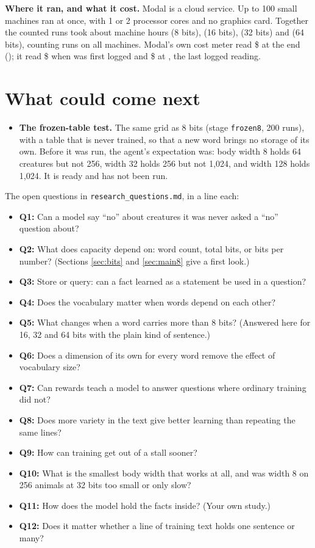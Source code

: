 \textbf{Where it ran, and what it cost.} Modal is a cloud service. Up to 100 small machines ran at
once, with 1 or 2 processor cores and no graphics card. Together the counted runs took about
 machine hours (8 bits),  (16 bits),  (32 bits) and
 (64 bits), counting runs on all machines. Modal's own cost meter read
\$ at the end (); it read \$ when
 was first logged and \$ at , the last
logged reading.

\section{What could come next}\label{sec:next}

\begin{itemize}
\item \textbf{The frozen-table test.} The same grid as 8 bits (stage \texttt{frozen8}, 200 runs),
  with a table that is never trained, so that a new word brings no storage of its own. Before it
  was run, the agent's expectation was: body width 8 holds 64 creatures but not 256, width 32
  holds 256 but not 1,024, and width 128 holds 1,024. It is ready and has not been run.
\end{itemize}

The open questions in \texttt{research\_questions.md}, in a line each:
\begin{itemize}
\item \textbf{Q1:} Can a model say ``no'' about creatures it was never asked a ``no'' question about?
\item \textbf{Q2:} What does capacity depend on: word count, total bits, or bits per number?
  (Sections \ref{sec:bits} and \ref{sec:main8} give a first look.)
\item \textbf{Q3:} Store or query: can a fact learned as a statement be used in a question?
\item \textbf{Q4:} Does the vocabulary matter when words depend on each other?
\item \textbf{Q5:} What changes when a word carries more than 8 bits? (Answered here for 16, 32 and 64
  bits with the plain kind of sentence.)
\item \textbf{Q6:} Does a dimension of its own for every word remove the effect of vocabulary size?
\item \textbf{Q7:} Can rewards teach a model to answer questions where ordinary training did not?
\item \textbf{Q8:} Does more variety in the text give better learning than repeating the same lines?
\item \textbf{Q9:} How can training get out of a stall sooner?
\item \textbf{Q10:} What is the smallest body width that works at all, and was width 8 on 256
  animals at 32 bits too small or only slow?
\item \textbf{Q11:} How does the model hold the facts inside? (Your own study.)
\item \textbf{Q12:} Does it matter whether a line of training text holds one sentence or many?
\end{itemize}
